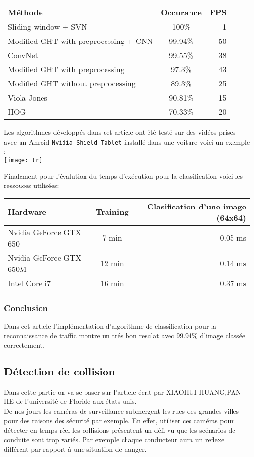 \documentclass[french,a4paper,11pt,oneside]{article}
\begin{document}
{{{				\begin{tabular}{|l|c|r|}
					\hline
					Méthode & Occurance & FPS \\
					\hline
					Sliding window + SVN & 100\% & 1  \\
					\hline
					Modified GHT with preprocessing + CNN & 99.94\% & 50 \\
					\hline
					ConvNet & 99.55\% & 38\\
					\hline
					Modified GHT with preprocessing & 97.3\% & 43 \\
					\hline
					Modified GHT without preprocessing & 89.3\% & 25 \\
					\hline
					Viola-Jones & 90.81\% & 15 \\
					\hline
					HOG & 70.33\% & 20 \\
					\hline
				\end{tabular}
			
				Les algorithmes développés dans cet article ont été testé sur des vidéos prises avec un Anroid \texttt{Nvidia Shield Tablet} installé dans une voiture voici un exemple :\\
				\texttt{[image: tr]}
				
				Finalement pour l'évalution du temps d'exécution pour la classification voici les ressouces utilisées:\\
				\begin{tabular}{|l|c|r|}
					\hline
					Hardware & Training & Clasification d'une image (64x64)\\
					\hline
					Nvidia GeForce GTX 650 & 7 min  & 0.05 ms  \\
					\hline
					Nvidia GeForce GTX 650M & 12 min & 0.14 ms \\
					\hline
					Intel Core i7 & 16 min  & 0.37 ms\\
					\hline
				\end{tabular}
	 		}
 			\subsubsection{Conclusion}{
 			Dans cet article l'implémentation d'algorithme de classification pour la reconnaissance de traffic montre un trés bon resulat avec 99.94\% d'image classée correctement.
 			}
	 	 }
 	
 	 	\subsection{Détection de collision}{
 	 		Dans cette partie on va se baser sur l'article écrit par XIAOHUI HUANG,PAN HE de l'université de Floride aux états-unis.\\
 	 		De nos jours les caméras de surveillance submergent les rues des grandes villes pour des raisons des sécurité par exemple. En effet, utiliser ces caméras pour détecter en temps réel les collisions présentent un défi vu que les scénarios de conduite sont trop variés. Par exemple chaque conducteur aura un reflexe différent par rapport à une situation de danger.\\
 	 		
}}
\end{document}
